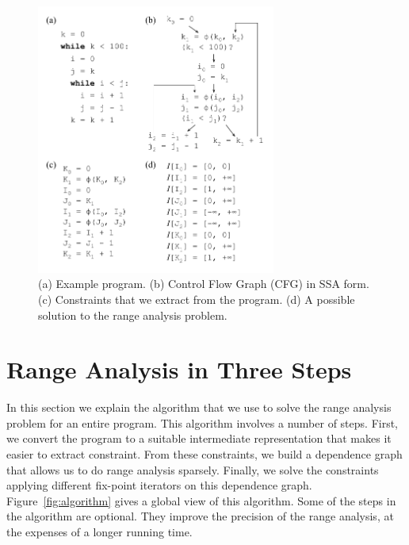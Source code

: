 \documentclass{llncs}
\begin{document}
\begin{figure}[t!]
\begin{center}
\includegraphics[width=0.7\textwidth]{images/ex1}
\end{center}
\caption{\label{fig:ex1}
(a) Example program.
(b) Control Flow Graph (CFG) in SSA form.
(c) Constraints that we extract from the program.
(d) A possible solution to the range analysis problem.}
\end{figure}

\section{Range Analysis in Three Steps}
\label{sec:algo}


In this section we explain the algorithm that we use to solve the range
analysis problem for an entire program.
This algorithm involves a number of steps.
First, we convert the program to a suitable intermediate representation that
makes it easier to extract constraint.
From these constraints, we build a dependence graph that allows us to do
range analysis sparsely.
Finally, we solve the constraints applying different fix-point iterators on
this dependence graph.
Figure~\ref{fig:algorithm} gives a global view of this algorithm.
Some of the steps in the algorithm are optional.
They improve the precision of the range analysis, at the expenses of a longer
running time.
\end{document}
